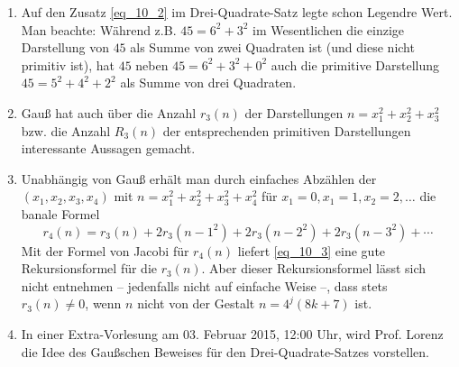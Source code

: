 \begin{enumerate}[1)]
	\item Auf den Zusatz \eqref{eq_10_2} im Drei-Quadrate-Satz legte schon Legendre Wert. Man beachte: Während z.B. $45 = 6^2+3^2$ im Wesentlichen die einzige Darstellung von $45$ als Summe von zwei Quadraten ist (und diese nicht primitiv ist), hat $45$ neben $45 = 6^2+3^2+0^2$ auch die primitive Darstellung $45 = 5^2+4^2+2^2$ als Summe von drei Quadraten.
	\item Gauß hat auch über die Anzahl $r_3(n)$ der Darstellungen $n = x_1^2 + x_2^2+x_3^2$ bzw. die Anzahl $R_3(n)$ der entsprechenden primitiven Darstellungen interessante Aussagen gemacht.
	\item Unabhängig von Gauß erhält man durch einfaches Abzählen der $(x_1,x_2,x_3,x_4)$ mit $n = x_1^2+x_2^2+x_3^2+x_4^2$ für $x_1 = 0, x_1=1, x_2 =2, \dots$ die banale Formel
	\begin{equation}
		r_4(n) = r_3(n) + 2r_3(n-1^2) + 2r_3(n-2^2) + 2r_3(n-3^2)+ \cdots \label{eq_10_3}
	\end{equation}
	Mit der Formel von Jacobi für $r_4(n)$ liefert \eqref{eq_10_3} eine gute Rekursionsformel für die $r_3(n)$. Aber dieser Rekursionsformel lässt sich nicht entnehmen -- jedenfalls nicht auf einfache Weise --, dass stets $r_3(n) \neq 0$, wenn $n$ nicht von der Gestalt $n = 4^j(8k+7)$ ist.
	\item In einer Extra-Vorlesung am 03. Februar 2015, 12:00 Uhr, wird Prof. Lorenz die Idee des Gaußschen Beweises für den Drei-Quadrate-Satzes vorstellen.
\end{enumerate}
\newpage
